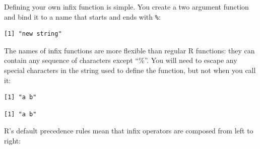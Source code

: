 \documentclass[]{book}
\newenvironment{Shaded}{\begin{snugshade}}{\end{snugshade}}
\newcommand{\CharTok}[1]{\textcolor[rgb]{0.31,0.60,0.02}{#1}}
\newcommand{\ControlFlowTok}[1]{\textcolor[rgb]{0.13,0.29,0.53}{\textbf{#1}}}
\newcommand{\DataTypeTok}[1]{\textcolor[rgb]{0.13,0.29,0.53}{#1}}
\newcommand{\KeywordTok}[1]{\textcolor[rgb]{0.13,0.29,0.53}{\textbf{#1}}}
\newcommand{\NormalTok}[1]{#1}
\newcommand{\OperatorTok}[1]{\textcolor[rgb]{0.81,0.36,0.00}{\textbf{#1}}}
\newcommand{\StringTok}[1]{\textcolor[rgb]{0.31,0.60,0.02}{#1}}
\theoremstyle{definition}
\theoremstyle{definition}
\theoremstyle{definition}
\theoremstyle{remark}
\begin{document}
Defining your own infix function is simple. You create a two argument
function and bind it to a name that starts and ends with \texttt{\%}:

\begin{Shaded}
\end{Shaded}

\begin{verbatim}
[1] "new string"
\end{verbatim}

The names of infix functions are more flexible than regular R functions:
they can contain any sequence of characters except ``\%''. You will need
to escape any special characters in the string used to define the
function, but not when you call it:

\begin{Shaded}
\end{Shaded}

\begin{verbatim}
[1] "a b"
\end{verbatim}

\begin{Shaded}
\end{Shaded}

\begin{verbatim}
[1] "a b"
\end{verbatim}

R's default precedence rules mean that infix operators are composed from
left to right:
\end{document}

